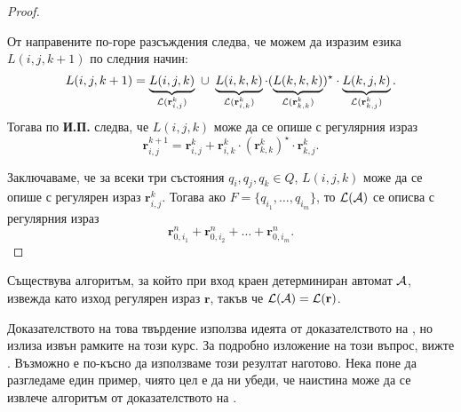 \begin{proof}
\begin{enumerate}[a)]
    От направените по-горе разсъждения следва, че можем да изразим езика $L(i,j,k+1)$ по следния начин:
    \[L(i,j,k+1) = \underbrace{L(i,j,k)}_{\L(\mathbf{r}^{k}_{i,j})}\ \cup\ \underbrace{L(i,k,k)}_{\L(\mathbf{r}^{k}_{i,k})}\cdot (\underbrace{L(k,k,k)}_{\L(\mathbf{r}^{k}_{k,k})})^\star \cdot \underbrace{L(k,j,k)}_{\L(\mathbf{r}^{k}_{k,j})}.\]
    Тогава по {\bf И.П.} следва, че $L(i,j,k)$ може да се опише с регулярния израз
    \begin{equation}
      \label{eq:kleene}
      \mathbf{r}^{k+1}_{i,j} = \mathbf{r}^{k}_{i,j} + \mathbf{r}^{k}_{i,k}\cdot (\mathbf{r}^{k}_{k,k})^\star\cdot \mathbf{r}^{k}_{k,j}.
    \end{equation}
  \end{enumerate}
  Заключаваме, че за всеки три състояния $q_i,q_j,q_k \in Q$, $L(i,j,k)$ може да се опише с регулярен израз $\mathbf{r}^{k}_{i,j}$.
  Тогава ако $F = \{q_{i_1},\dots,q_{i_m}\}$, то $\mathcal{L}(\mathcal{A})$ се описва с регулярния израз
  \[\mathbf{r}^n_{0,i_1} + \mathbf{r}^n_{0,i_2} + \dots + \mathbf{r}^n_{0,i_m}.\]
\end{proof}

\begin{prop}
  Съществува алгоритъм, за който при вход краен детерминиран автомат $\mathcal{A}$,
  извежда като изход регулярен израз $\mathbf{r}$, такъв че $\mathcal{L}(\mathcal{A}) = \mathcal{L}(\mathbf{r})$.
\end{prop}

Доказателството на това твърдение използва идеята от доказателството на ,
но излиза извън рамките на този курс. За подробно изложение на този въпрос, вижте \cite[стр. 69]{sipser3}.
Възможно е по-късно да използваме този резултат наготово.
Нека поне да разгледаме един пример, чиято цел е да ни убеди, 
че наистина може да се извлече алгоритъм от доказателството на .

